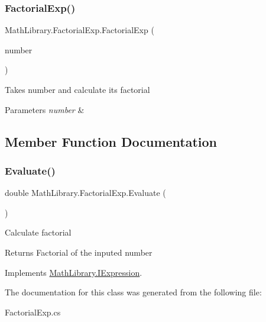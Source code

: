\subsubsection{\texorpdfstring{FactorialExp()}{FactorialExp()}}
{\footnotesize\ttfamily Math\+Library.\+Factorial\+Exp.\+Factorial\+Exp (\begin{DoxyParamCaption}\item[{\mbox{\hyperlink{interface_math_library_1_1_i_expression}{I\+Expression}}}]{number }\end{DoxyParamCaption})\hspace{0.3cm}{\ttfamily [inline]}}



Takes number and calculate it\textquotesingle{}s factorial 


\begin{DoxyParams}{Parameters}
{\em number} & \\
\hline
\end{DoxyParams}


\subsection{Member Function Documentation}
\mbox{\label{class_math_library_1_1_factorial_exp_aac39a4c6ddfbbd8eb6f494e97b7ff894}} 
\subsubsection{\texorpdfstring{Evaluate()}{Evaluate()}}
{\footnotesize\ttfamily double Math\+Library.\+Factorial\+Exp.\+Evaluate (\begin{DoxyParamCaption}{ }\end{DoxyParamCaption})\hspace{0.3cm}{\ttfamily [inline]}}



Calculate factorial 

\begin{DoxyReturn}{Returns}
Factorial of the inputed number
\end{DoxyReturn}


Implements \mbox{\hyperlink{interface_math_library_1_1_i_expression}{Math\+Library.\+I\+Expression}}.



The documentation for this class was generated from the following file\+:\begin{DoxyCompactItemize}
\item 
Factorial\+Exp.\+cs\end{DoxyCompactItemize}
